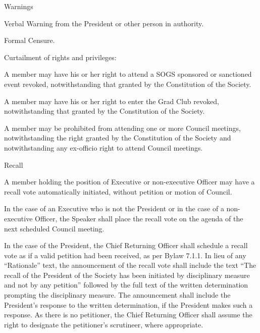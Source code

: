 \begin{longenum}[ label*=\thesubsection.\arabic*., align=left]
	\item Warnings
    \begin{longenum}[ label*=\arabic*., align=left]
		\item Verbal Warning from the President or other person in authority.
        \item Formal Censure.
	\end{longenum}
    \item Curtailment of rights and privileges:
    \begin{longenum}[ label*=\arabic*., align=left]
		\item A member may have his or her right to attend a SOGS sponsored or sanctioned event revoked, notwithstanding that granted by the Constitution of the Society.
        \item A member may have his or her right to enter the Grad Club revoked, notwithstanding that granted by the Constitution of the Society.
        \item A member may be prohibited from attending one or more Council meetings, notwithstanding the right granted by the Constitution of the Society and notwithstanding any ex-officio right to attend Council meetings.
	\end{longenum}
    \item Recall
    \begin{longenum}[ label*=\arabic*., align=left]
		\item A member holding the position of Executive or non-executive Officer may have a recall vote automatically initiated, without petition or motion of Council.
        \item In the case of an Executive who is not the President or in the case of a non-executive Officer, the Speaker shall place the recall vote on the agenda of the next scheduled Council meeting.
        \item In the case of the President, the Chief Returning Officer shall schedule a recall vote as if a valid petition had been received, as per Bylaw 7.1.1. In lieu of any ``Rationale'' text, the announcement of the recall vote shall include the text ``The recall of the President of the Society has been initiated by disciplinary measure and not by any petition'' followed by the full text of the written determination prompting the disciplinary measure. The announcement shall include the President's response to the written determination, if the President makes such a response. As there is no petitioner, the Chief Returning Officer shall assume the right to designate the petitioner's scrutineer, where appropriate.

\end{longenum}
\end{longenum}
